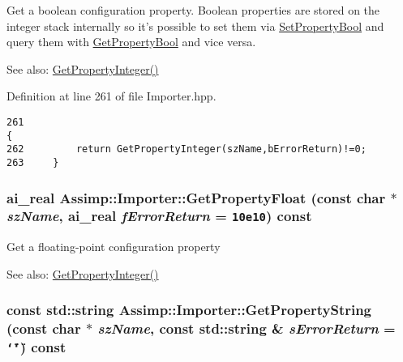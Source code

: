 Get a boolean configuration property. Boolean properties are stored on the integer stack internally so it's possible to set them via \hyperlink{class_assimp_1_1_importer_4af22a88eddf464d949a761149c72825}{SetPropertyBool} and query them with \hyperlink{class_assimp_1_1_importer_90f5d35d25e5d2a0ef8bc0c6545b2010}{GetPropertyBool} and vice versa. \begin{Desc}
\item[See also:]\hyperlink{class_assimp_1_1_importer_3e796a0758a9f10f13107f44c542ad41}{GetPropertyInteger()} \end{Desc}


Definition at line 261 of file Importer.hpp.

\begin{Code}\begin{verbatim}261                                                                               {
262         return GetPropertyInteger(szName,bErrorReturn)!=0;
263     }
\end{verbatim}
\end{Code}


\hypertarget{class_assimp_1_1_importer_dfe1387ccc837fd59bf620e8216637fa}{
\subsubsection[GetPropertyFloat]{\setlength{\rightskip}{0pt plus 5cm}ai\_\-real Assimp::Importer::GetPropertyFloat (const char $\ast$ {\em szName}, \/  ai\_\-real {\em fErrorReturn} = {\tt 10e10}) const}}
\label{class_assimp_1_1_importer_dfe1387ccc837fd59bf620e8216637fa}


Get a floating-point configuration property \begin{Desc}
\item[See also:]\hyperlink{class_assimp_1_1_importer_3e796a0758a9f10f13107f44c542ad41}{GetPropertyInteger()} \end{Desc}
\hypertarget{class_assimp_1_1_importer_a31cc1aa8f83056fe097b149354ddfd3}{
\subsubsection[GetPropertyString]{\setlength{\rightskip}{0pt plus 5cm}const std::string Assimp::Importer::GetPropertyString (const char $\ast$ {\em szName}, \/  const std::string \& {\em sErrorReturn} = {\tt \char`\"{}\char`\"{}}) const}}
\label{class_assimp_1_1_importer_a31cc1aa8f83056fe097b149354ddfd3}


